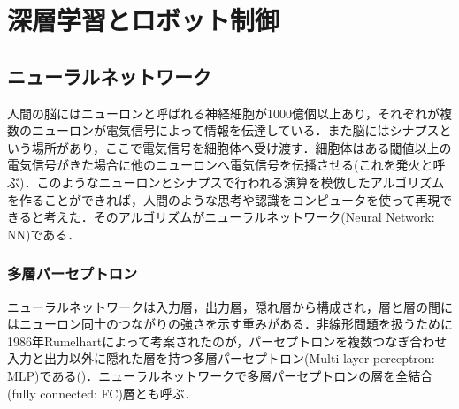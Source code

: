 \chapter{深層学習とロボット制御}
\label{chap_review}
\newpage

\section{ニューラルネットワーク}\label{sec:NeuralNetwork}
人間の脳にはニューロンと呼ばれる神経細胞が1000億個以上あり，それぞれが複数のニューロンが電気信号によって情報を伝達している．また脳にはシナプスという場所があり，ここで電気信号を細胞体へ受け渡す．細胞体はある閾値以上の電気信号がきた場合に他のニューロンへ電気信号を伝播させる(これを発火と呼ぶ)．このようなニューロンとシナプスで行われる演算を模倣したアルゴリズムを作ることができれば，人間のような思考や認識をコンピュータを使って再現できると考えた．そのアルゴリズムがニューラルネットワーク(Neural Network: NN)である．

\subsection{多層パーセプトロン}
ニューラルネットワークは入力層，出力層，隠れ層から構成され，層と層の間にはニューロン同士のつながりの強さを示す重みがある．非線形問題を扱うために1986年Rumelhartによって考案されたのが，パーセプトロンを複数つなぎ合わせ入力と出力以外に隠れた層を持つ多層パーセプトロン(Multi-layer perceptron: MLP)である()．ニューラルネットワークで多層パーセプトロンの層を全結合(fully connected: FC)層とも呼ぶ．

